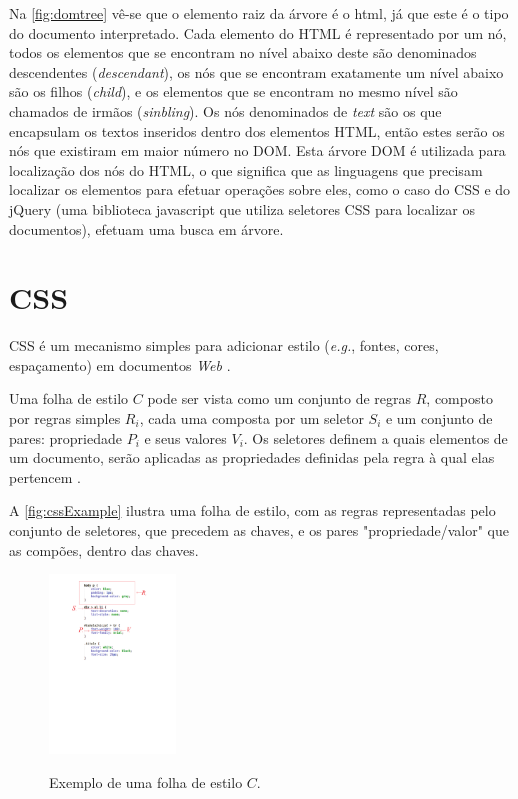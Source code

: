 Na \autoref{fig:domtree} vê-se que o elemento raiz da árvore é o html, já que este é o tipo do documento interpretado. Cada elemento do HTML é representado por um nó, todos os elementos que se encontram no nível abaixo deste são denominados descendentes (\textit{descendant}), os nós que se encontram exatamente um nível abaixo são os filhos (\textit{child}), e os elementos que se encontram no mesmo nível são chamados de irmãos (\textit{sinbling}). Os nós denominados de \textit{text} são os que encapsulam os textos inseridos dentro dos elementos HTML, então estes serão os nós que existiram em maior número no DOM. 
Esta árvore DOM é utilizada para localização dos nós do HTML, o que significa que as linguagens que precisam localizar os elementos para efetuar operações sobre eles, como o caso do CSS e do jQuery (uma biblioteca javascript que utiliza seletores CSS para localizar os documentos), efetuam uma busca em árvore.

\section{CSS}
\label{sec:CSS}
CSS é um mecanismo simples para adicionar estilo (\textit{e.g.}, fontes, cores, espaçamento) em documentos \textit{Web} \cite{W3Ccss2015}.

Uma folha de estilo \(C\) pode ser vista como um conjunto de regras \(R\), composto por regras simples \(R_i\), cada uma composta por um seletor \(S_i\) e um conjunto de pares: propriedade \(P_i\) e seus valores \(V_i\). Os seletores definem a quais elementos de um documento, serão aplicadas as propriedades definidas pela regra à qual elas pertencem \cite{Geneves2012}.

A \autoref{fig:cssExample} ilustra uma folha de estilo, com as regras representadas pelo conjunto de seletores, que precedem as chaves, e os pares "propriedade/valor" que as compões, dentro das chaves.

\begin{figure}[!htb]
	\centering
	\caption{Exemplo de uma folha de estilo \(C\).}
	\includegraphics[width=0.3\textwidth]{./04-figuras/css_example_marked}
	\label{fig:cssExample}
\end{figure}

